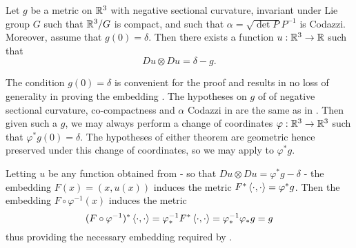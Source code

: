 \documentclass[a4paper, 12pt]{amsart}
\begin{document}
\begin{thm}
\label{thm:pde}
Let \(g\) be a metric on \(\mathbb{R}^3\) with negative sectional curvature, invariant under Lie group \(G\) such that \(\mathbb{R}^3/G\) is compact, and such that \(\alpha = \sqrt{\det P}P^{-1}\) is Codazzi. Moreover, assume that \(g(0) = \delta\). Then there exists a function \(u : \mathbb{R}^3 \to \mathbb{R}\) such that
\[
Du \otimes Du = \delta - g.
\]
\end{thm}

\begin{rem}
The condition \(g(0) = \delta\) is convenient for the proof and results in no loss of generality in proving the embedding . The hypotheses on \(g\) of of negative sectional curvature, co-compactness and \(\alpha\) Codazzi in  are the same as in . Then given such a \(g\), we may always perform a change of coordinates \(\varphi : \mathbb{R}^3 \to \mathbb{R}^3\) such that \(\varphi^{\ast} g (0) = \delta\). The hypotheses of either theorem are geometric hence preserved under this change of coordinates, so we may apply  to \(\varphi^{\ast} g\).

Letting \(u\) be any function obtained from  - so that \(Du \otimes Du = \varphi^{\ast} g - \delta\) - the embedding \(F(x) = (x, u(x))\) induces the metric \(F^{\ast} \left\langle \cdot,\cdot \right\rangle = \varphi^{\ast} g\). Then the embedding \(F \circ \varphi^{-1} (x)\) induces the metric
\[
(F \circ \varphi^{-1})^{\ast} \left\langle \cdot,\cdot \right\rangle = \varphi^{-1}_{\ast} F^{\ast} \left\langle \cdot,\cdot \right\rangle = \varphi^{-1}_{\ast} \varphi_{\ast} g = g
\]
thus providing the necessary embedding required by .
\end{rem}
\end{document}
